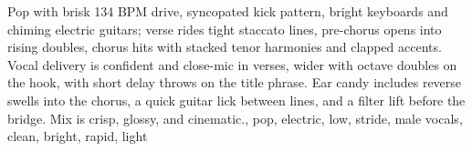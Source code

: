 
\begin{notes}
\end{notes}
\begin{style}
Pop with brisk 134 BPM drive, syncopated kick pattern, bright keyboards and chiming electric guitars; verse rides tight staccato lines, pre-chorus opens into rising doubles, chorus hits with stacked tenor harmonies and clapped accents. Vocal delivery is confident and close-mic in verses, wider with octave doubles on the hook, with short delay throws on the title phrase. Ear candy includes reverse swells into the chorus, a quick guitar lick between lines, and a filter lift before the bridge. Mix is crisp, glossy, and cinematic., pop, electric, low, stride, male vocals, clean, bright, rapid, light
\end{style}
